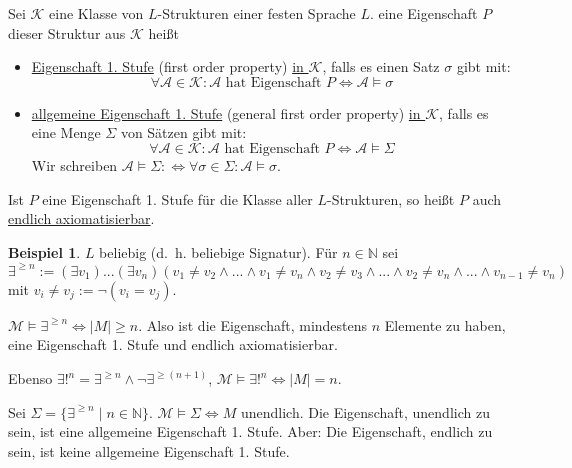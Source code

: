 \documentclass{article}
\theoremstyle{definition}
\newtheorem*{bsp}{Beispiel}
\theoremstyle{plain}
\newcommand{\m}[1]{\mathcal{#1}}
\begin{document}
    Sei $ \m{K} $ eine Klasse von $ L $-Strukturen einer festen Sprache $ L $.
    eine Eigenschaft $ P$ dieser Struktur aus $ \m{K} $ heißt
    \begin{itemize}
        \item \underline{Eigenschaft 1. Stufe} (first order property) \underline{in $ \m{K} $}, falls es einen Satz $ \sigma $ gibt mit:
        \begin{equation*}
            \forall \m{A} \in \m{K} : \m{A} \text{ hat Eigenschaft } P \Leftrightarrow \m{A} \models \sigma
        \end{equation*}
        \item \underline{allgemeine Eigenschaft 1. Stufe} (general first order property) \underline{in $ \m{K} $}, falls es eine Menge $ \Sigma $ von Sätzen gibt mit:
        \begin{equation*}
            \forall \m{A} \in \m{K} : \m{A} \text{ hat Eigenschaft } P \Leftrightarrow \m{A} \models \Sigma
        \end{equation*}
        Wir schreiben $ \m{A} \models \Sigma :\Leftrightarrow \forall \sigma \in \Sigma: \m{A} \models \sigma $.
    \end{itemize}
    Ist $ P $ eine Eigenschaft 1. Stufe für die Klasse aller $ L $-Strukturen, so heißt $ P $ auch \underline{endlich axiomatisierbar}.

    \begin{bsp}
        $ L $ beliebig (d.~h. beliebige Signatur).
        Für $ n \in \mathbb{N} $ sei
        \begin{equation*}
            \exists^{\geq n} := (\exists v_1) ... (\exists v_n) (v_1 \not = v_2 \land ... \land v_1 \not = v_n \land v_2 \not = v_3 \land ... \land v_2 \not = v_n \land ... \land v_{n-1} \not = v_n)
        \end{equation*}
        mit $ v_i \not = v_j := \neg (v_i = v_j) $.

        $ \m{M} \models \exists^{\geq n} \Leftrightarrow | M | \geq n $.
        Also ist die Eigenschaft, mindestens $ n $ Elemente zu haben, eine Eigenschaft 1. Stufe und endlich axiomatisierbar.

        Ebenso $ \exists!^n = \exists^{\geq n} \land \neg \exists^{\geq(n+1)} $, $ \m{M} \models \exists!^n \Leftrightarrow |M| = n $.

        Sei $ \Sigma = \{ \exists^{\geq n} \mid n \in \mathbb{N} \} $.
        $ \m{M} \models \Sigma \Leftrightarrow M $ unendlich.
        Die Eigenschaft, unendlich zu sein, ist eine allgemeine Eigenschaft 1. Stufe.
        Aber: Die Eigenschaft, endlich zu sein, ist keine allgemeine Eigenschaft 1. Stufe.
    \end{bsp}
\end{document}
